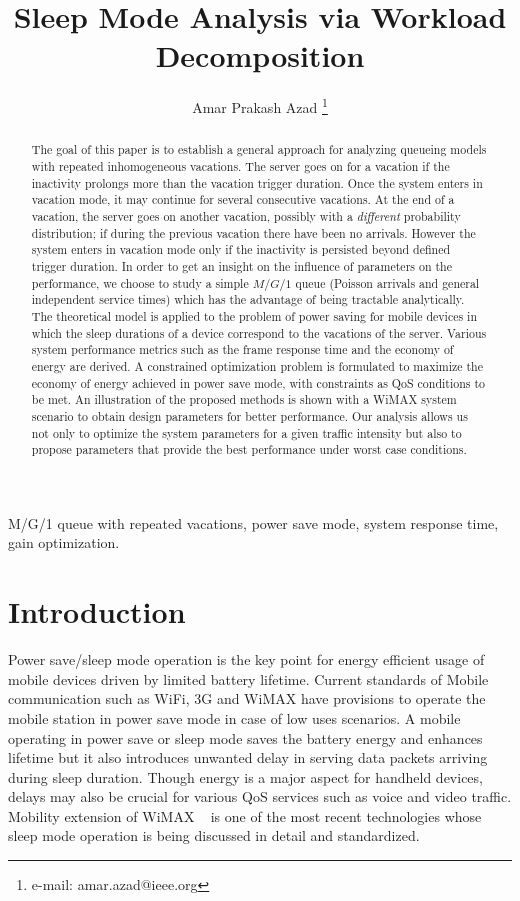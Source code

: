 \documentclass[journal]{IEEEtran}
\begin{document}
\title{ Sleep Mode Analysis via Workload Decomposition }
\author{Amar Prakash Azad \thanks{ e-mail: amar.azad@ieee.org}
}
\maketitle
\begin{abstract}
The goal of this paper is to establish a general approach for analyzing queueing models with repeated inhomogeneous vacations. The server goes on for a vacation if the inactivity prolongs more than the vacation trigger duration. Once the system enters in vacation mode, it may continue for several consecutive vacations. At the end of a vacation, the server goes on another vacation, possibly with a {\em different} probability distribution; if during the previous vacation there have been no arrivals. However the system enters in vacation mode only if the inactivity is persisted beyond defined trigger duration. In order to get an insight on the influence of parameters on the performance, we choose to study a simple $M/G/1$ queue
(Poisson arrivals and general independent service times) which has the advantage of being tractable analytically. The theoretical model is applied to the problem of power saving for mobile devices in which the sleep durations of a device correspond to the vacations of the server. Various system performance metrics such as the frame response time and the economy of energy are derived. A constrained optimization problem is formulated to maximize the economy of energy achieved in power save mode, with constraints as QoS conditions to be met. An illustration of the proposed methods is shown with a WiMAX system scenario to obtain design parameters for better performance. Our analysis allows us not only to optimize the system parameters for a given traffic intensity but also to propose parameters that provide the best performance under worst case conditions.
\end{abstract}
\begin{IEEEkeywords}
M/G/1 queue with repeated vacations, power save mode, system
response time, gain optimization.
\end{IEEEkeywords}
\section{Introduction}
\label{s:intro}
Power save/sleep mode operation is the key point for energy efficient usage of mobile devices driven by limited battery lifetime. Current standards of Mobile communication such as WiFi, 3G and WiMAX have provisions to operate the mobile station in power save mode in case of low uses scenarios. A mobile operating in power save or sleep mode saves the battery energy and enhances lifetime but it also introduces unwanted delay in serving data packets arriving during sleep duration. Though energy is a major aspect for handheld devices, delays may also be crucial for various QoS services such as voice and video traffic. Mobility extension of WiMAX ~ \cite{man} is one of the most recent technologies whose sleep mode operation is being discussed in detail and standardized. 
\end{document}
